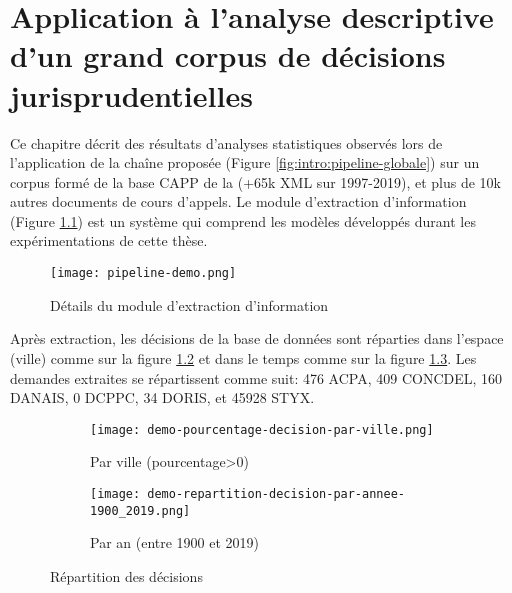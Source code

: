 \chapter{Application à l'analyse descriptive d'un grand corpus de décisions jurisprudentielles}
\label{chap:demo}
Ce chapitre décrit des résultats d'analyses statistiques observés lors de l'application de la chaîne proposée (Figure \ref{fig:intro:pipeline-globale}) sur un corpus formé de la base CAPP de la \citet{dila2019capp} (+65k XML sur 1997-2019), et plus de 10k autres documents de cours d'appels. Le module d'extraction d'information (Figure \ref{fig:demo:module-extraction}) est un système qui comprend les modèles développés durant les expérimentations de cette thèse. 



\begin{figure}[!htb]
	\centering 
	\texttt{[image: pipeline-demo.png]}
	\caption{Détails du module d'extraction d'information}\label{fig:demo:module-extraction}
\end{figure}

Après extraction, les décisions de la base de données sont réparties dans l'espace (ville) comme sur la figure \ref{fig:demo:doc-per-city} et dans le temps comme sur la figure \ref{fig:demo:doc-per-year}. Les demandes extraites se répartissent comme suit: 476 ACPA, 409 CONCDEL, 160 DANAIS, 0 DCPPC, 34 DORIS, et 45928 STYX.  

\begin{figure}[ht]
	\centering
	\begin{subfigure}[ht]{0.55\textwidth}
		\centering
		\centering
		\texttt{[image: demo-pourcentage-decision-par-ville.png]}
		\caption{Par ville (pourcentage>0)} \label{fig:demo:doc-per-city}
	\end{subfigure} 
	\begin{subfigure}[ht]{0.43\textwidth}
		\centering
		\texttt{[image: demo-repartition-decision-par-annee-1900\_2019.png]}
		\caption{Par an (entre 1900 et 2019)} \label{fig:demo:doc-per-year}
	\end{subfigure}
	\caption{Répartition des décisions} \label{fig:demo:docs-distribution-over-time-and-space}
\end{figure}


